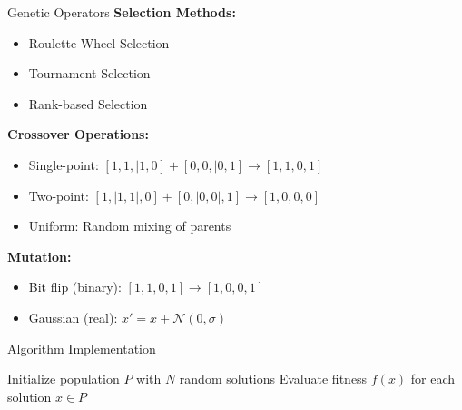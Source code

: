 \documentclass[10pt]{beamer}
\begin{document}
\begin{frame}{Genetic Operators}
    \textbf{Selection Methods:}
    \begin{itemize}
        \item Roulette Wheel Selection
        \item Tournament Selection
        \item Rank-based Selection
    \end{itemize}
    
    \textbf{Crossover Operations:}
    \begin{itemize}
        \item Single-point: $[1,1,|1,0] + [0,0,|0,1] \rightarrow [1,1,0,1]$
        \item Two-point: $[1,|1,1|,0] + [0,|0,0|,1] \rightarrow [1,0,0,0]$
        \item Uniform: Random mixing of parents
    \end{itemize}
    
    \textbf{Mutation:}
    \begin{itemize}
        \item Bit flip (binary): $[1,1,0,1] \rightarrow [1,0,0,1]$
        \item Gaussian (real): $x' = x + \mathcal{N}(0,\sigma)$
    \end{itemize}
\end{frame}

\begin{frame}{Algorithm Implementation}
    \begin{algorithm2e}[H]
    \SetAlgoLined
    
    Initialize population $P$ with $N$ random solutions\;
    Evaluate fitness $f(x)$ for each solution $x \in P$\;
    
    \caption{Genetic Algorithm for Optimization}
    \end{algorithm2e}
\end{frame}
\end{document}
